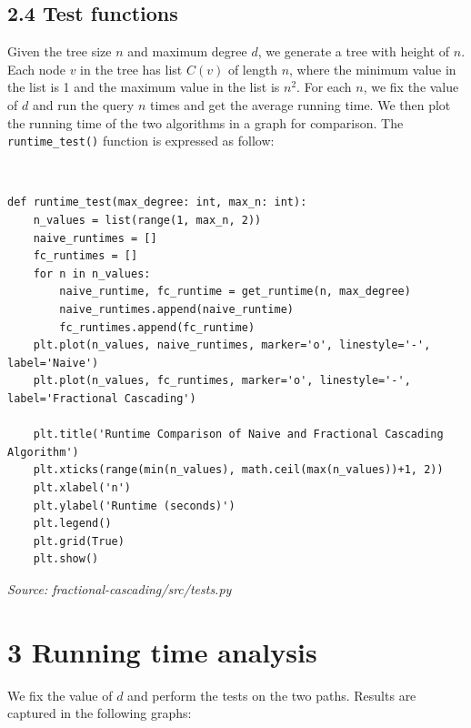 \documentclass[12pt,english,]{article}
\newcommand{\code}[1]{\colorbox{light-gray}{\texttt{#1}}}
\begin{document}
\hypertarget{section2.4}{%
\subsection{\texorpdfstring{2.4 Test functions}{2.4 Test functions}}\label{section2.4}}

Given the tree size $n$ and maximum degree $d$, we generate a tree with height of $n$. Each node $v$ in the tree has list $C(v)$ of length $n$, where the minimum value in the list is 1 and the maximum value in the list is $n^2$. For each $n$, we fix the value of $d$ and run the query $n$ times and get the average running time. We then plot the running time of the two algorithms in a graph for comparison. The \code{runtime\_test()} function is expressed as follow:

~

\begin{lstlisting}
def runtime_test(max_degree: int, max_n: int):
    n_values = list(range(1, max_n, 2))
    naive_runtimes = []
    fc_runtimes = []
    for n in n_values:
        naive_runtime, fc_runtime = get_runtime(n, max_degree)
        naive_runtimes.append(naive_runtime)
        fc_runtimes.append(fc_runtime)
    plt.plot(n_values, naive_runtimes, marker='o', linestyle='-', label='Naive')
    plt.plot(n_values, fc_runtimes, marker='o', linestyle='-', label='Fractional Cascading')

    plt.title('Runtime Comparison of Naive and Fractional Cascading Algorithm')
    plt.xticks(range(min(n_values), math.ceil(max(n_values))+1, 2))
    plt.xlabel('n')
    plt.ylabel('Runtime (seconds)')
    plt.legend()
    plt.grid(True)
    plt.show()
\end{lstlisting}
\vspace{-9truemm}
\begin{minipage}{1\textwidth}
  \begin{flushright}
  {\footnotesize \emph{Source: fractional-cascading/src/tests.py }\par}
  \end{flushright}
\end{minipage}
\vspace{0.5truemm}

\hypertarget{section3}{%
\section{\texorpdfstring{3 \enspace Running time analysis}{3 Running time analysis}}\label{section3}}

We fix the value of $d$ and perform the tests on the two paths. Results are captured in the
following graphs:
\end{document}
